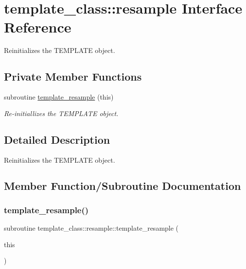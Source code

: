 \hypertarget{interfacetemplate__class_1_1resample}{}\section{template\+\_\+class\+:\+:resample Interface Reference}
\label{interfacetemplate__class_1_1resample}


Reinitializes the T\+E\+M\+P\+L\+A\+TE object.  


\subsection*{Private Member Functions}
\begin{DoxyCompactItemize}
\item 
subroutine \hyperlink{interfacetemplate__class_1_1resample_a669d30540574ac29919c0a6a856d052c}{template\+\_\+resample} (this)
\begin{DoxyCompactList}\small\item\em Re-\/initiallizes the T\+E\+M\+P\+L\+A\+TE object. \end{DoxyCompactList}\end{DoxyCompactItemize}


\subsection{Detailed Description}
Reinitializes the T\+E\+M\+P\+L\+A\+TE object. 

\subsection{Member Function/\+Subroutine Documentation}
\mbox{\label{interfacetemplate__class_1_1resample_a669d30540574ac29919c0a6a856d052c}} 
\subsubsection{\texorpdfstring{template\+\_\+resample()}{template\_resample()}}
{\footnotesize\ttfamily subroutine template\+\_\+class\+::resample\+::template\+\_\+resample (\begin{DoxyParamCaption}\item[{type(\hyperlink{structtemplate__class_1_1template}{template}), intent(inout)}]{this }\end{DoxyParamCaption})\hspace{0.3cm}{\ttfamily [private]}}



